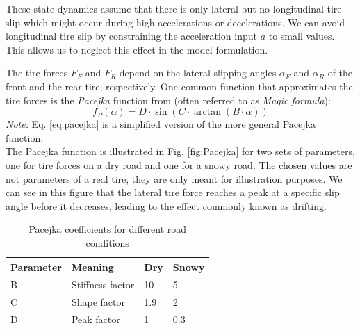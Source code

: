 These state dynamics assume that there is only lateral but no longitudinal tire slip which might occur during high accelerations or decelerations. We can avoid longitudinal tire slip by constraining the acceleration input $a$ to small values. This allows us to neglect this effect in the model formulation.

The tire forces $F_F$ and $F_R$ depend on the lateral slipping angles $\alpha_F$ and $\alpha_R$ of the front and the rear tire, respectively. One common function that approximates the tire forces is the \emph{Pacejka} function from \cite{pacejka1987} (often referred to as \emph{Magic formula}):
\begin{equation}\label{eq:pacejka}
f_P(\alpha) = D\cdot\sin(C\cdot\arctan(B\cdot\alpha))
\end{equation}
\emph{Note:} Eq. \eqref{eq:pacejka} is a simplified version of the more general Pacejka function.\\
The Pacejka function is illustrated in Fig. \ref{fig:Pacejka} for two sets of parameters, one for tire forces on a dry road and one for a snowy road. The chosen values are not parameters of a real tire, they are only meant for illustration purposes. We can see in this figure that the lateral tire force reaches a peak at a specific slip angle before it decreases, leading to the effect commonly known as drifting.
\begin{table}[h!]
\centering
\caption{Pacejka coefficients for different road conditions}
\begin{tabular}{l|l|l|l}
Parameter & Meaning & Dry & Snowy\\
\hline
B & Stiffness factor & 10 & 5\\
C & Shape factor & 1.9 & 2\\
D & Peak factor & 1 & 0.3
\end{tabular}
\label{tab:pacejka}
\end{table}


